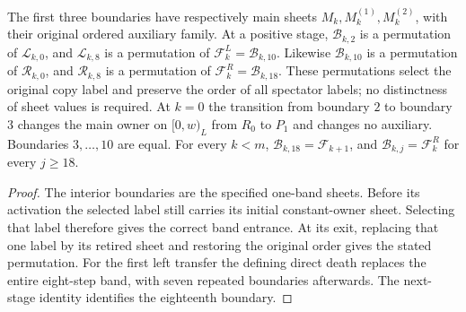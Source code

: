 \begin{lemma}
    \label{thm:chain_sweep_local_boundaries}
    \leanok
    The first three boundaries have respectively main sheets
    $M_k,M_k^{(1)},M_k^{(2)}$, with their original ordered auxiliary
    family. At a positive stage, $\mathcal B_{k,2}$ is a permutation of
    $\mathcal L_{k,0}$, and $\mathcal L_{k,8}$ is a permutation of
    $\mathcal F_k^L=\mathcal B_{k,10}$.
    Likewise $\mathcal B_{k,10}$ is a permutation of $\mathcal R_{k,0}$,
    and $\mathcal R_{k,8}$ is a permutation of
    $\mathcal F_k^R=\mathcal B_{k,18}$.
    These permutations select the original copy label and preserve the
    order of all spectator labels; no distinctness of sheet values is required.
    At $k=0$ the transition from boundary $2$ to boundary $3$ changes
    the main owner on $[0,w)_L$ from $R_0$ to $P_1$ and changes no
    auxiliary. Boundaries $3,\ldots,10$ are equal.
    For every $k<m$, $\mathcal B_{k,18}=\mathcal F_{k+1}$, and
    $\mathcal B_{k,j}=\mathcal F_k^R$ for every $j\ge18$.
\end{lemma}
\begin{proof}\leanok
    The interior boundaries are the specified one-band sheets.
    Before its activation the selected label still carries its initial
    constant-owner sheet. Selecting that label therefore gives the
    correct band entrance. At its exit, replacing that one label by
    its retired sheet and restoring the original order gives
    the stated permutation. For the first left transfer the defining
    direct death replaces the entire eight-step band, with seven
    repeated boundaries afterwards. The next-stage identity identifies
    the eighteenth boundary.
\end{proof}

